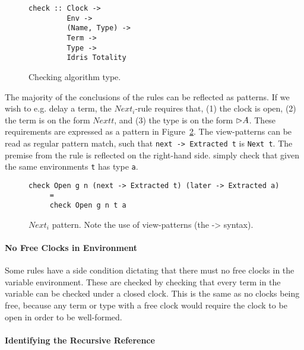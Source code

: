 \begin{figure}[h]
\begin{lstlisting}
check :: Clock -> 
         Env -> 
         (Name, Type) -> 
         Term -> 
         Type -> 
         Idris Totality
\end{lstlisting}  
  \caption{Checking algorithm type.}
  \label{fig:check_type}
\end{figure}

The majority of the conclusions of the rules can be reflected as patterns. If we
wish to e.g. delay a term, the $Next_i$-rule requires that, (1) the clock is
open, (2) the term is on the form $Next t$, and (3) the type is on the form
$\rhd A$. These requirements are expressed as a pattern in
Figure~\ref{fig:next_pattern}. The view-patterns can be read as regular pattern
match, such that \texttt{next -> Extracted t} is \texttt{Next t}. The premise
from the rule is reflected on the right-hand side. simply check that given the
same environments \texttt{t} has type \texttt{a}.

\begin{figure}[h]
\begin{lstlisting}
check Open g n (next -> Extracted t) (later -> Extracted a) 
     =
     check Open g n t a
\end{lstlisting}
  \caption{$Next_{i}$ pattern. Note the use of view-patterns (the -> syntax).}
  \label{fig:next_pattern}
\end{figure}

\paragraph{No Free Clocks in Environment}
Some rules have a side condition dictating that there must no free clocks in the
variable environment. These are checked by checking that every term in the
variable can be checked under a closed clock. This is the same as no clocks
being free, because any term or type with a free clock would require the clock
to be open in order to be well-formed. 
\paragraph{Identifying the Recursive Reference}


